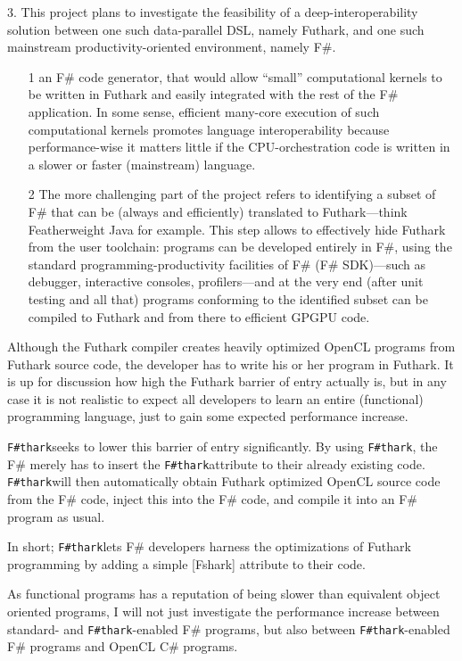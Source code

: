\documentclass{article}
\newcommand{\fshark}{\texttt{F\#thark}}
\begin{document}
3. This project plans to investigate the feasibility of a deep-interoperability
solution between one such data-parallel DSL, namely Futhark, and one such
mainstream productivity-oriented environment, namely F\#. 
\begin{itemize}
    \item[1] an F\# code generator, that would allow ``small'' computational
        kernels to be written in Futhark and easily integrated with the
        rest of the F\# application. In some sense, efficient many-core
        execution of such computational kernels promotes language interoperability
        because performance-wise it matters little if the CPU-orchestration code
        is written in a slower or faster (mainstream) language.
    \item[2] The more challenging part of the project refers to identifying
        a subset of F\# that can be (always and efficiently) translated to 
        Futhark---think Featherweight Java for example.
        This step allows to effectively hide Futhark from the user toolchain:
        programs can be developed entirely in F\#, using the standard 
        programming-productivity facilities of F\# (F\# SDK)---such as debugger,
        interactive consoles, profilers---and at the very end (after unit testing and all that)
        programs conforming to the identified subset can be compiled to Futhark
        and from there to efficient GPGPU code.
\end{itemize}




Although the Futhark compiler creates heavily optimized OpenCL programs from
Futhark source code, the developer has to write his or her program in Futhark.
It is up for discussion how high the Futhark barrier of entry actually is, 
but in any case it is not realistic to expect all developers to learn an entire 
(functional) programming language, just to gain some expected 
performance increase.

\fshark seeks to lower this barrier of entry significantly.
By using \fshark, the F\# merely has to insert the \fshark attribute to their
already existing code. \fshark will then automatically obtain Futhark optimized
OpenCL source code from the F\# code, inject this into the F\# code, and compile
it into an F\# program as usual.


In short; \fshark lets F\# developers harness the optimizations of Futhark
programming by adding a simple [Fshark] attribute to their code.

As functional programs has a reputation of being slower than equivalent object
oriented programs, I will not just investigate the performance increase between
standard- and \fshark-enabled F\# programs, but also between \fshark-enabled F#
programs and OpenCL C\# programs.
\end{document}
